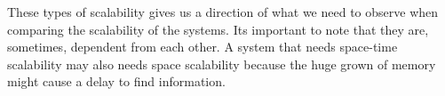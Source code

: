 These types of scalability gives us a direction of what we need to observe when comparing the scalability of the systems. Its important to note that they are, sometimes, dependent from each other. A system that needs space-time scalability may also needs space scalability because the huge grown of memory might cause a delay to find information.

















